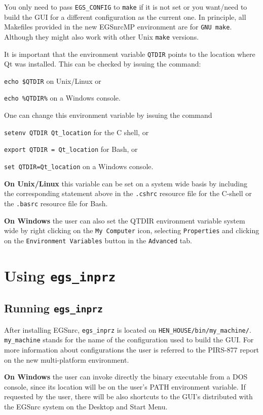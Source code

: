 \documentclass[12pt,twoside]{article}   %
\begin{document}
 You only need to pass {\tt EGS\_CONFIG} to {\tt make} if it is not set
or you want/need to build the GUI for a different configuration as the current one.
In principle, all Makefiles provided in the new EGSnrcMP environment are for {\tt GNU make}.
Although they might also work with other Unix {\tt make} versions.

It is important that the environment variable {\tt QTDIR} points to the location where
Qt was installed. This can be checked by issuing the command:

      {\tt echo \$QTDIR} on Unix/Linux or

      {\tt echo \%QTDIR\%} on a Windows console.

One can change this environment variable by issuing the command

      {\tt setenv QTDIR Qt\_location} for the C shell, or

      {\tt export QTDIR = Qt\_location} for Bash, or

      {\tt set QTDIR=Qt\_location} on a Windows console.

{\bf On Unix/Linux} this variable can be set on a system wide basis by including the
corresponding statement above in the {\tt .cshrc} resource file for the C-shell or
the {\tt .basrc} resource file for Bash.

{\bf On Windows} the user can also set the QTDIR environment variable system wide by
right clicking on the {\tt My Computer} icon, selecting {\tt Properties} and clicking on the
{\tt Environment Variables} button in the {\tt Advanced} tab.

\newpage
\section{Using {\tt egs\_inprz}}
\subsection{Running {\tt egs\_inprz}}

After installing EGSnrc, {\tt egs\_inprz} is located on {\tt HEN\_HOUSE/bin/my\_machine/}.
{\tt my\_machine} stands for the name of the configuration used to build the GUI. For more
information about configurations the user is referred to the PIRS-877 report on the new
multi-platform environment\cite{Ka03}.

{\bf On Windows} the user can invoke directly the binary executable from a DOS console, since its
location will be on the user's PATH environment variable. If requested by the user, there will
be also shortcuts to the GUI's distributed with the EGSnrc system on the Desktop and
Start Menu.
\end{document}
